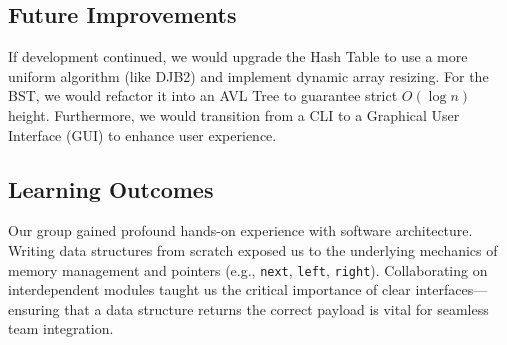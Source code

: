 \documentclass[11pt,a4paper]{article}
\begin{document}
\subsection{Future Improvements}
If development continued, we would upgrade the Hash Table to use a more uniform algorithm (like DJB2) and implement dynamic array resizing. For the BST, we would refactor it into an AVL Tree to guarantee strict $O(\log n)$ height. Furthermore, we would transition from a CLI to a Graphical User Interface (GUI) to enhance user experience.

\subsection{Learning Outcomes}
Our group gained profound hands-on experience with software architecture. Writing data structures from scratch exposed us to the underlying mechanics of memory management and pointers (e.g., \texttt{next}, \texttt{left}, \texttt{right}). Collaborating on interdependent modules taught us the critical importance of clear interfaces—ensuring that a data structure returns the correct payload is vital for seamless team integration.
\end{document}
